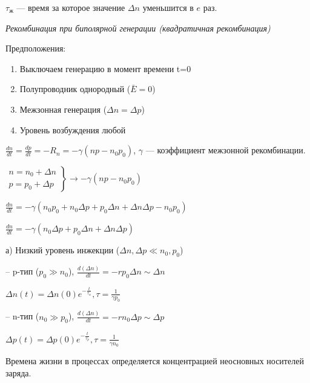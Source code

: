 $\tau_\text{ж}$ --- время за которое значение $\Delta n$ уменьшится в $e$ раз.


\begin{figure}[h!]
    \centering
\end{figure}


\textit{Рекомбинация при биполярной генерации (квадратичная рекомбинация)}

Предположения:

\begin{enumerate}
    \item Выключаем генерацию в момент времени t=0
    \item Полупроводник однородный ($\bar{E}=0$)
    \item Межзонная генерация ($\Delta n = \Delta p$)
    \item Уровень возбуждения любой
\end{enumerate}

$\frac{d n}{d t}=\frac{d p}{d t}=-R_n=-\gamma\left(n p-n_0 p_0\right)$, $\gamma$ --- коэффициент межзонной рекомбинации.

$\left.\begin{array}{l}n=n_0+\Delta n \\ p=p_0+\Delta p\end{array}\right\} \rightarrow-\gamma\left(n p-n_0 p_0\right)$

$\displaystyle \frac{d n}{d t}=-\gamma\left(n_0 p_0+n_0 \Delta p+p_0 \Delta n+\Delta n \Delta p-n_0 p_0\right)$ 

$\displaystyle \frac{d n}{d t}=-\gamma\left(n_0 \Delta p+p_0 \Delta n+\Delta n \Delta p\right)$

\vspace{0.5cm}

а) Низкий уровень инжекции ($\Delta n, \Delta p \ll n_0, p_0$)

-- p-тип ($p_0\gg n_0$), $\frac{d(\Delta n)}{d t}=-r p_0 \Delta n \sim \Delta n$

$\Delta n(t)=\Delta n(0) e^{-\frac{t}{\tau_n}}, \tau = \frac{1}{\gamma p_0}$

-- n-тип ($n_0\gg p_0$), $\frac{d(\Delta n)}{d t}=-r n_0 \Delta p \sim \Delta p$

$\Delta p(t)=\Delta p(0) e^{-\frac{t}{\tau_p}}, \tau=\frac{1}{\gamma n_0}$

Времена жизни в процессах определяется концентрацией неосновных носителей заряда.

